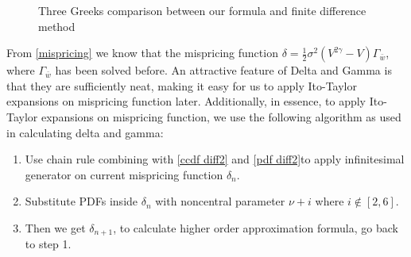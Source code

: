 \begin{figure}[ht]
    \hfill
    \caption{Three Greeks comparison between our formula and finite difference method}\label{greeks}
  \end{figure}

From \eqref{mispricing} we know that the mispricing function $\delta = \frac{1}{2} \sigma^2 (V^{2\gamma}-V) \Gamma_{\bar{w}}$, where $\Gamma_{\bar{w}}$ has been solved before. An attractive feature of Delta and Gamma is that they are sufficiently neat, making it easy for us to apply Ito-Taylor expansions on mispricing function later. Additionally, in essence, to apply Ito-Taylor expansions on mispricing function, we use the following algorithm as used in calculating delta and gamma:

\begin{enumerate}
    \item Use chain rule combining with \eqref{ccdf diff2} and \eqref{pdf diff2}to apply infinitesimal generator on current mispricing function $\delta_{n}$.
    \item Substitute PDFs inside $\delta_n$ with noncentral parameter $\nu+i$ where $i \notin [2,6]$.
    \item Then we get $\delta_{n+1}$, to calculate higher order approximation formula, go back to step 1.
\end{enumerate}

